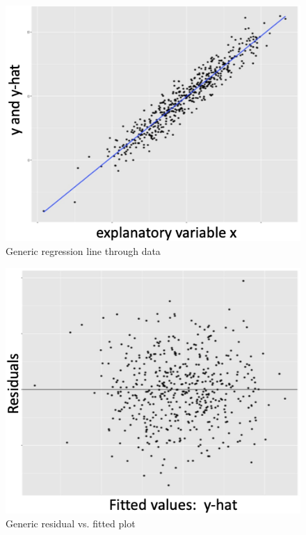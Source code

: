 \documentclass[
]{book}
\begin{document}
\begin{figure}

{\centering \includegraphics[width=\textwidth]{images/genericreg} 

}

\caption{Generic regression line through data}\label{fig:genericreg}
\end{figure}

\begin{figure}

{\centering \includegraphics[width=\textwidth]{images/genericrvfp} 

}

\caption{Generic residual vs. fitted plot}\label{fig:genericrvfp}
\end{figure}
\end{document}

